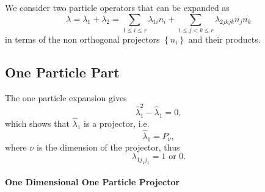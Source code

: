\documentclass[12pt]{article}
\begin{document}
We consider two particle operators that can be expanded as 
\begin{equation}
\lambda =\lambda _{1}+\lambda _{2}=\sum_{1\leq i\leq r}\lambda
_{1i}n_{i}+\sum_{1\leq j<k\leq r}\lambda _{2jkjk}n_{j}n_{k}
\end{equation}%
in terms of the non orthogonal projectors $\left\{ n_{i}\right\} $ and their
products.

\subsection{One Particle Part}

The one particle expansion gives 
\begin{equation*}
\hat{\lambda}_{1}^{2}-\hat{\lambda}_{1}=0,
\end{equation*}%
which shows that $\hat{\lambda}_{1}$ is a projector, i.e. 
\begin{equation*}
\hat{\lambda}_{1}=P_{\nu },
\end{equation*}%
where $\nu $ is the dimension of the projector, thus 
\begin{equation*}
\lambda _{1j_{1}j_{1}}=1\text{ or }0.
\end{equation*}

\paragraph{One Dimensional One Particle Projector}
\end{document}

